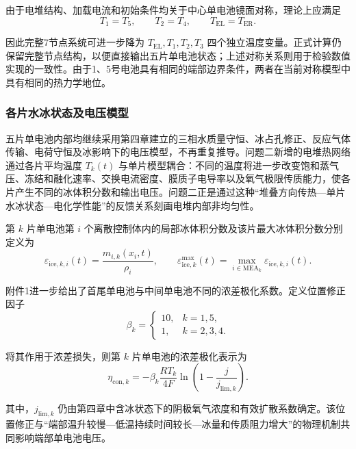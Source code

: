 \documentclass[bwprint]{gmcmthesis}
\numberwithin{figure}{section}
\begin{document}
\noindent 由于电堆结构、加载电流和初始条件均关于中心单电池镜面对称，理论上应满足
\begin{equation}
T_1 = T_5, \qquad T_2 = T_4, \qquad T_{\text{EL}} = T_{\text{ER}}. \tag{5-37}
\end{equation}

\noindent 因此完整7节点系统可进一步降为 \(T_{\text{EL}}, T_1, T_2, T_3\) 四个独立温度变量。正式计算仍保留完整节点结构，以便直接输出五片单电池状态；上述对称关系则用于检验数值实现的一致性。由于1、5号电池具有相同的端部边界条件，两者在当前对称模型中具有相同的热力学地位。

\subsubsection{各片水冰状态及电压模型}

五片单电池内部均继续采用第四章建立的三相水质量守恒、冰占孔修正、反应气体传输、电荷守恒及冰影响下的电压模型，不再重复推导。问题二新增的电堆热网络通过各片平均温度 \(T_k(t)\) 与单片模型耦合：不同的温度将进一步改变饱和蒸气压、冻结和融化速率、交换电流密度、膜质子电导率以及氧气极限传质能力，使各片产生不同的冰体积分数和输出电压。问题二正是通过这种“堆叠方向传热—单片水冰状态—电化学性能”的反馈关系刻画电堆内部非均匀性。

\noindent 第 \(k\) 片单电池第 \(i\) 个离散控制体内的局部冰体积分数及该片最大冰体积分数分别定义为
\begin{equation}
\varepsilon_{\text{ice},k,i}(t) = \frac{m_{i,k}(x_i, t)}{\rho_i}, \qquad \varepsilon_{\text{ice},k}^{\text{max}}(t) = \max_{i \in \text{MEA}_k} \varepsilon_{\text{ice},k,i}(t). \tag{5-38}
\end{equation}

\noindent 附件1进一步给出了首尾单电池与中间单电池不同的浓差极化系数。定义位置修正因子
\begin{equation}
\beta_k = \begin{cases} 10, & k = 1, 5, \\ 1, & k = 2, 3, 4. \end{cases} \tag{5-39}
\end{equation}

\noindent 将其作用于浓差损失，则第 \(k\) 片单电池的浓差极化表示为
\begin{equation}
\eta_{\text{con},k} = -\beta_k \frac{RT_k}{4F} \ln \left( 1 - \frac{j}{j_{\text{lim},k}} \right). \tag{5-40}
\end{equation}

\noindent 其中，\(j_{\text{lim},k}\) 仍由第四章中含冰状态下的阴极氧气浓度和有效扩散系数确定。该位置修正与“端部温升较慢—低温持续时间较长—冰量和传质阻力增大”的物理机制共同影响端部单电池电压。
\end{document}
